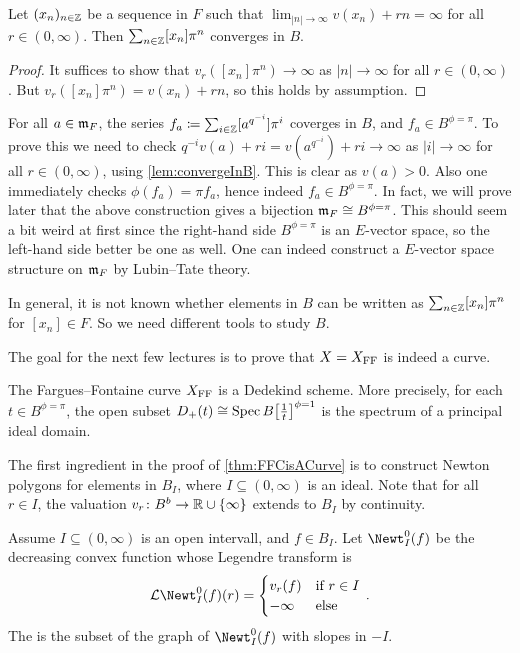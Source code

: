 \begin{lem}\label{lem:convergeInB}
	Let $(x_n)_{n\in\mathbb{Z}}$ be a sequence in $F$ such that $\lim_{|n|\to\infty}v(x_n)+rn=\infty$ for all $r\in(0,\infty)$. Then $\sum_{n\in\mathbb{Z}}[x_n]\pi^n$ converges in $B$.
\end{lem}
\begin{proof}
	It suffices to show that $v_r([x_n]\pi^n)\to\infty$ as $|n|\to\infty$ for all $r\in(0,\infty)$. But $v_r([x_n]\pi^n)=v(x_n)+rn$, so this holds by assumption.
\end{proof}
\begin{rem}\label{lem:convergenceInB}
	\begin{numerate}
		\item For all $a\in \mathfrak{m}_F$, the series $f_a\coloneqq \sum_{i\in\mathbb{Z}}[a^{q^{-i}}]\pi^i$ coverges in $B$, and $f_a\in B^{\phi=\pi}$. To prove this we need to check $q^{-i}v(a)+ri=v(a^{q^{-i}})+ri\to \infty$ as $|i|\to\infty$ for all $r\in(0,\infty)$, using \cref{lem:convergeInB}. This is clear as $v(a)>0$. Also one immediately checks $\phi(f_a)=\pi f_a$, hence indeed $f_a\in B^{\phi=\pi}$. In fact, we will prove later that the above construction gives a bijection $\mm_F\cong B^{\phi=\pi}$. This should seem a bit weird at first since the right-hand side $B^{\phi=\pi}$ is an $E$-vector space, so the left-hand side better be one as well. One can indeed construct a $E$-vector space structure on $\mathfrak{m}_F$ by Lubin--Tate theory.
		\item In general, it is not known whether elements in $B$ can be written as $\sum_{n\in\mathbb{Z}}[x_n]\pi^n$ for $[x_n]\in F$. So we need different tools to study $B$.
	\end{numerate}
\end{rem}
The goal for the next few lectures is to prove that $X=X_{\mathrm{FF}}$ is indeed a curve.
\begin{mainthm}\label{thm:FFCisACurve}
	The Fargues--Fontaine curve $X_{\mathrm{FF}}$ is a Dedekind scheme. More precisely, for each $t\in B^{\phi=\pi}$, the open subset $D_+(t)\cong \Spec B\big[\frac 1t\big]^{\phi=1}$ is the spectrum of a principal ideal domain.
\end{mainthm}
The first ingredient in the proof of \cref{thm:FFCisACurve} is to construct Newton polygons for elements in $B_I$, where $I\subseteq (0,\infty)$ is an ideal. Note that for all $r\in I$, the valuation $v_r\colon B^b\morphism \IR\cup\{\infty\}$ extends to $B_I$ by continuity.
\begin{defi}\label{def:NewtOpen}
	Assume $I\subseteq (0,\infty)$ is an open intervall, and $f\in B_I$. Let $\Newt_I^0(f)$ be the decreasing convex function whose Legendre transform is
	\begin{equation*}
		\Ll\Newt_I^0(f)(r)=\begin{cases}
		v_r(f) & \text{if }r\in I\\
		-\infty & \text{else}
		\end{cases}\,.
	\end{equation*}
	The  is the subset of the graph of $\Newt_I^0(f)$ with slopes in $-I$.
\end{defi}
